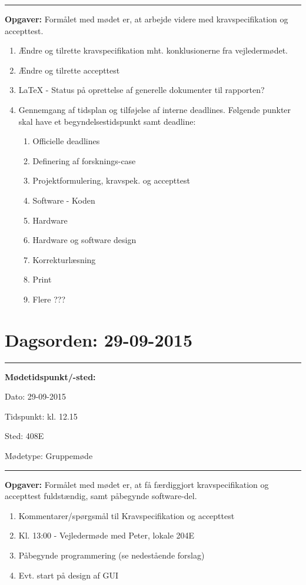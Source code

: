 \hrule
\textbf{Opgaver:} \newline
Formålet med mødet er, at arbejde videre med kravspecifikation og accepttest.
\begin{enumerate}
\item Ændre og tilrette kravspecifikation mht. konklusionerne fra vejledermødet.

\item Ændre og tilrette accepttest

\item LaTeX - Status på oprettelse af generelle dokumenter til rapporten?

\item Gennemgang af tidsplan og tilføjelse af interne deadlines. Følgende punkter skal have et begyndelsestidspunkt samt deadline:
\begin{enumerate}
\item Officielle deadlines
\item Definering af forsknings-case
\item Projektformulering, kravspek. og accepttest
\item Software - Koden
\item Hardware
\item Hardware og software design
\item Korrekturlæsning
\item Print
\item Flere ???

\end{enumerate}
\end{enumerate}

\newpage
\section{Dagsorden: 29-09-2015}
\hrule



\textbf{Mødetidspunkt/-sted:} 

Dato: \tabto{7em} 29-09-2015

Tidspunkt: \tabto{7em} kl. 12.15

Sted: \tabto{7em} 408E

Mødetype: \tabto{7em} Gruppemøde \newline


\hrule
\textbf{Opgaver:} \newline
Formålet med mødet er, at få færdiggjort kravspecifikation og accepttest fuldstændig, samt påbegynde software-del.
\begin{enumerate}
\item Kommentarer/spørgsmål til Kravspecifikation og accepttest

\item Kl. 13:00 - Vejledermøde med Peter, lokale 204E

\item Påbegynde programmering (se nedestående forslag)

\item Evt. start på design af GUI
\end{enumerate}

